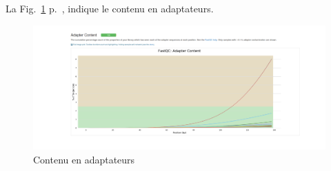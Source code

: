 \documentclass[a4paper,11pt]{article}
\begin{document}
La Fig.~\ref{fig-MultiQC_Plots7} p.~\pageref{fig-MultiQC_Plots7},
indique le contenu en adaptateurs.

\begin{figure}
  \begin{center}
    \includegraphics[width=16cm]{Images/MultiQC_Plots7}
  \end{center}
  \caption{Contenu en adaptateurs}
  \label{fig-MultiQC_Plots7}
\end{figure}
\end{document}
